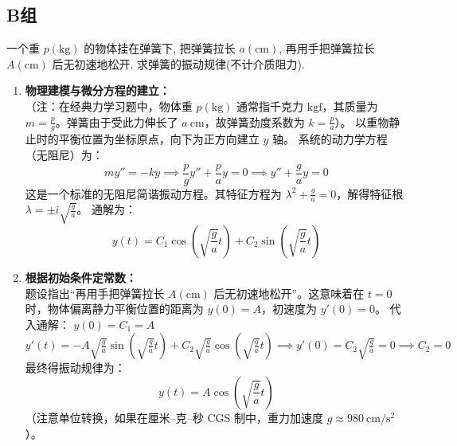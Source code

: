 \documentclass[lang=cn,11pt]{elegantbook}
\begin{document}
\subsection{B组}

\begin{exercise}[无阻尼自由振动物理建模]
一个重 $p(\mathrm{kg})$ 的物体挂在弹簧下, 把弹簧拉长 $a(\mathrm{cm})$, 再用手把弹簧拉长 $A(\mathrm{cm})$ 后无初速地松开. 求弹簧的振动规律(不计介质阻力).
\end{exercise}
\begin{solution}
\begin{enumerate}
    \item \textbf{物理建模与微分方程的建立：}\\
    （注：在经典力学习题中，物体重 $p(\mathrm{kg})$ 通常指千克力 $\mathrm{kgf}$，其质量为 $m = \frac{p}{g}$。弹簧由于受此力伸长了 $a\ \mathrm{cm}$，故弹簧劲度系数为 $k = \frac{p}{a}$）。
    以重物静止时的平衡位置为坐标原点，向下为正方向建立 $y$ 轴。
    系统的动力学方程（无阻尼）为：
    \[
    m y'' = -k y \implies \frac{p}{g} y'' + \frac{p}{a} y = 0 \implies y'' + \frac{g}{a} y = 0
    \]
    这是一个标准的无阻尼简谐振动方程。其特征方程为 $\lambda^2 + \frac{g}{a} = 0$，解得特征根 $\lambda = \pm i\sqrt{\frac{g}{a}}$。
    通解为：
    \[
    y(t) = C_1\cos\left(\sqrt{\frac{g}{a}}t\right) + C_2\sin\left(\sqrt{\frac{g}{a}}t\right)
    \]

    \item \textbf{根据初始条件定常数：}\\
    题设指出“再用手把弹簧拉长 $A(\mathrm{cm})$ 后无初速地松开”。这意味着在 $t=0$ 时，物体偏离静力平衡位置的距离为 $y(0) = A$，初速度为 $y'(0) = 0$。
    代入通解：
    $y(0) = C_1 = A$
    $y'(t) = -A\sqrt{\frac{g}{a}}\sin\left(\sqrt{\frac{g}{a}}t\right) + C_2\sqrt{\frac{g}{a}}\cos\left(\sqrt{\frac{g}{a}}t\right) \implies y'(0) = C_2\sqrt{\frac{g}{a}} = 0 \implies C_2=0$
    最终得振动规律为：
    \[
    \boxed{y(t) = A\cos\left(\sqrt{\frac{g}{a}}t\right)}
    \]
    （注意单位转换，如果在厘米–克–秒 CGS 制中，重力加速度 $g \approx 980\ \mathrm{cm/s^2}$）。
\end{enumerate}
\end{solution}
\end{document}
